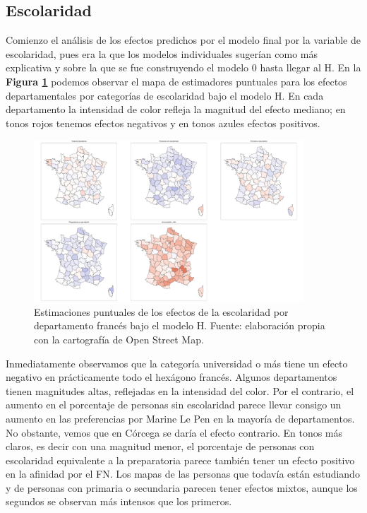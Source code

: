 \subsection{Escolaridad}

Comienzo el análisis de los efectos predichos por el modelo final por la variable de escolaridad, pues era la que los modelos individuales sugerían como más explicativa y sobre la que se fue construyendo el modelo 0 hasta llegar al H. En la \textbf{Figura \ref{fig:Mapa_Efectos_Escolaridad}} podemos observar el mapa de estimadores puntuales para los efectos departamentales por categorías de escolaridad bajo el modelo H. En cada departamento la intensidad de color refleja la magnitud del efecto mediano; en tonos rojos tenemos efectos negativos y en tonos azules efectos positivos.\\

\begin{figure}[h]
	\centering
	\includegraphics[width = 0.9\textwidth]{Figs/Efectos/Mapa_Efectos_Escolaridad_Modelo_H}
	\caption{Estimaciones puntuales de los efectos de la escolaridad por departamento francés bajo el modelo H. Fuente: elaboración propia con la cartografía de Open Street Map.}
	\label{fig:Mapa_Efectos_Escolaridad}
\end{figure}

Inmediatamente observamos que la categoría universidad o más tiene un efecto negativo en prácticamente todo el hexágono francés. Algunos departamentos tienen magnitudes altas, reflejadas en la intensidad del color. Por el contrario, el aumento en el porcentaje de personas sin escolaridad parece llevar consigo un aumento en las preferencias por Marine Le Pen en la mayoría de departamentos. No obstante, vemos que en Córcega se daría el efecto contrario. En tonos más claros, es decir con una magnitud menor, el porcentaje de personas con escolaridad equivalente a la preparatoria parece también tener un efecto positivo en la afinidad por el FN. Los mapas de las personas que todavía están estudiando y de personas con primaria o secundaria parecen tener efectos mixtos, aunque los segundos se observan más intensos que los primeros.\\

